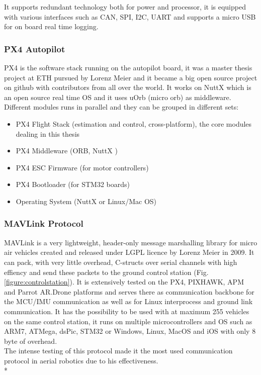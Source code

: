 It supports redundant technology both for power and processor, it is equipped with various interfaces such as CAN, SPI, I2C, UART and supports a micro USB for on board real time logging.

\subsubsection{PX4 Autopilot}
\label{sec:px4autop}
PX4 \cite{PX4} is the software stack running on the autopilot board, it was a master thesis project at ETH pursued by Lorenz Meier and it became a big open source project on github \cite{PX4Git} with contributors from all over the world. It works on NuttX \cite{Nutty} which is an open source real time OS and it uses uOrb (micro orb) as middleware. Different modules runs in parallel and they can be grouped in different sets:

\begin{itemize}

\item PX4 Flight Stack (estimation and control, cross-platform), the core modules dealing in this thesis
\item PX4 Middleware (ORB, NuttX )
\item PX4 ESC Firmware (for motor controllers)
\item PX4 Bootloader (for STM32 boards)
\item Operating System (NuttX or Linux/Mac OS)

\end{itemize}

\subsubsection{MAVLink Protocol}
\label{sec:mavlink}
MAVLink is a very lightweight, header-only message marshalling library for micro air vehicles created and released under LGPL licence by Lorenz Meier in 2009.
It can pack, with very little overhead, C-structs over serial channels with high effiency and send these packets to the ground control station (Fig. \ref{figure:controlstation}). It is extensively tested on the PX4, PIXHAWK, APM and Parrot AR.Drone platforms and serves there as communication backbone for the MCU/IMU communication as well as for Linux interprocess and ground link communication. It has the possibility to be used with at maximum 255 vehicles on the same control station, it runs on multiple microcontrollers and OS such as  ARM7, ATMega, dsPic, STM32 or Windows, Linux, MacOS and iOS with only 8 byte of overhead. \\ 
The intense testing of this protocol made it the most used communication protocol in aerial robotics due to his effectiveness. \\*


